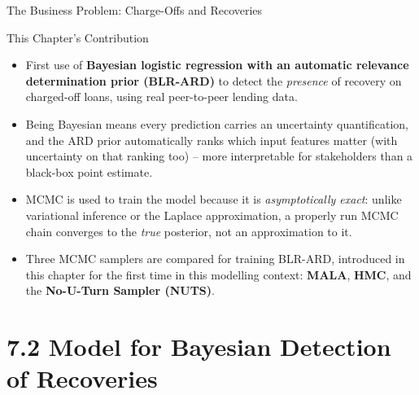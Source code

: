 \documentclass[aspectratio=169,10pt]{beamer}
\begin{document}
\begin{frame}[allowframebreaks]{The Business Problem: Charge-Offs and Recoveries}
\begin{block}{This Chapter's Contribution}
\begin{itemize}
  \item First use of \textbf{Bayesian logistic regression with an automatic relevance determination prior (BLR-ARD)} to detect the \emph{presence} of recovery on charged-off loans, using real peer-to-peer lending data.
  \item Being Bayesian means every prediction carries an uncertainty quantification, and the ARD prior automatically ranks which input features matter (with uncertainty on that ranking too) -- more interpretable for stakeholders than a black-box point estimate.
  \item MCMC is used to train the model because it is \emph{asymptotically exact}: unlike variational inference or the Laplace approximation, a properly run MCMC chain converges to the \emph{true} posterior, not an approximation to it.
  \item Three MCMC samplers are compared for training BLR-ARD, introduced in this chapter for the first time in this modelling context: \textbf{MALA}, \textbf{HMC}, and the \textbf{No-U-Turn Sampler (NUTS)}.
\end{itemize}
\end{block}

\end{frame}

\section{7.2 Model for Bayesian Detection of Recoveries}
\end{document}
